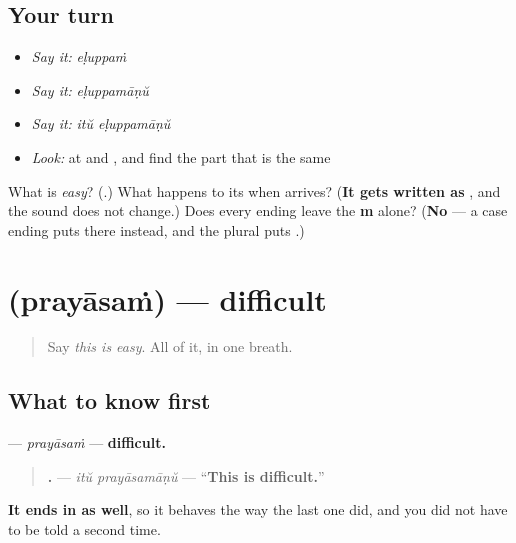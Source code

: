\subsection*{Your turn}
\begin{itemize}
\raggedright
  \item \emph{Say it:} \emph{eḷuppaṁ}
  \item \emph{Say it:} \emph{eḷuppamāṇŭ}
  \item \emph{Say it:} \emph{itŭ eḷuppamāṇŭ}
  \item \emph{Look:} at \textbf{} and \textbf{}, and find the part that is the same
\end{itemize}

\begin{tcolorbox}[breakable,colback=teal!4,colframe=teal!35!black,title={Before you move on}]
What is \emph{easy}? (\textbf{}.) What happens to its \textbf{} when \textbf{} arrives? (\textbf{It gets written as }, and the sound does not change.) Does every ending leave the \textbf{m} alone? (\textbf{No} — a case ending puts \textbf{} there instead, and the plural puts \textbf{}.)
\end{tcolorbox}
\section[\texorpdfstring{\ml{പ്രയാസം} (prayāsaṁ)}{പ്രയാസം (prayāsaṁ)}]{ (prayāsaṁ) — difficult}

\label{lesson:ML-C96-prayaasam}



\begin{quote}
Say \emph{this is easy}. All of it, in one breath.
\end{quote}

\subsection*{What to know first}
\textbf{} — \emph{prayāsaṁ} — \textbf{difficult.}

\begin{quote}
\textbf{ .} — \emph{itŭ prayāsamāṇŭ} — \textquotedblleft{}\textbf{This is difficult.}\textquotedblright{}
\end{quote}

\textbf{It ends in  as well}, so it behaves the way the last one did, and you did not have to be told a second time.

